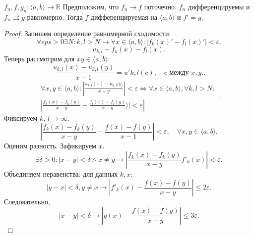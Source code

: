 \documentclass[11pt]{book}
\newcommand{\R}{\mathbb{R}}
\renewcommand{\le}{\leqslant}
\theoremstyle{definition}
\theoremstyle{plain}
\theoremstyle{plain}
\theoremstyle{definition}
\theoremstyle{remark}
\begin{document}
\begin{thm}
    $f_n, f, g_n : \langle a, b \rangle  \to  \R$ Предположим, что $f_n \to  f$ поточечно.
    $f_n$ дифференцируемы и $f_n \rightrightarrows g$ равномерно. Тогда $f$  дифференцируемая на $\langle a, b \rangle$ и $f '= g$.
\end{thm}
\begin{proof}
    Запишем определение равномерной сходимости:
    \[
	\forall  eps >0 \exists  N : k, l > N \to  \forall  x \in  \langle a, b\rangle : |f_k(x) ' - f_l(x) '| < \varepsilon
    .\]
    \[
	u_{k, l} - f_k(x) - f_l(x)
    .\]
    Теперь рассмотрим для $x y \in  \langle a, b \rangle:$
    \[
	\frac{u_{k, l} (x)  - u_{k, l} (y)}{x-1} = u'{k,l}(c), \quad c \text{ между } x, y.
    .\]
    \[
	\begin{array}{r}
	    \forall x, y \in  \langle a, b \rangle : \left | \frac{u_{k, l} (x) - u_{k, l} (y_)}{x - y} \right | < \varepsilon  \Longleftrightarrow \forall  x \in  \langle a, b \rangle , \forall  k, l > N:\\
	    \left | \frac{f_k(x) - f_k(y) }{x-y} - \frac{f_l(x) - f_l(y)}{x-y} \rangle | < \varepsilon
	    \right |
	\end{array}
    .\]
    Фиксируем $k$, $l \to  \infty$.
    \[
	\left | \frac{f_k(x) - f_k(y)}{x - y} - \frac{f(x) - f(y)}{x-1} \right | < \varepsilon  , \quad \forall  x, y \in  \langle a, b \rangle
    .\]
    Оценим разность. Зафикируем $ x$.
    \[
	\exists  \delta  >0 : |x-y| < \delta  \wedge x \ne y\to  |\frac{f_k(x) - f_k(y)}{x-y} f'_k(x)|  < \varepsilon
    .\]
    Объединяем неравенства:
    для данных $ k, x$:
    \[
	|y - x| < \delta  , y \ne x \to  |f'_k(x) - \frac{f(x) - f(y)}{x-y}| \le  2 \varepsilon
    .\]
    Следовательно,
    \[
	|x - y| < \delta \to  |g(x) - \frac{f(x) - f(y)}{x-y}| \le 3 \varepsilon
    .\]
\end{proof}
\end{document}
